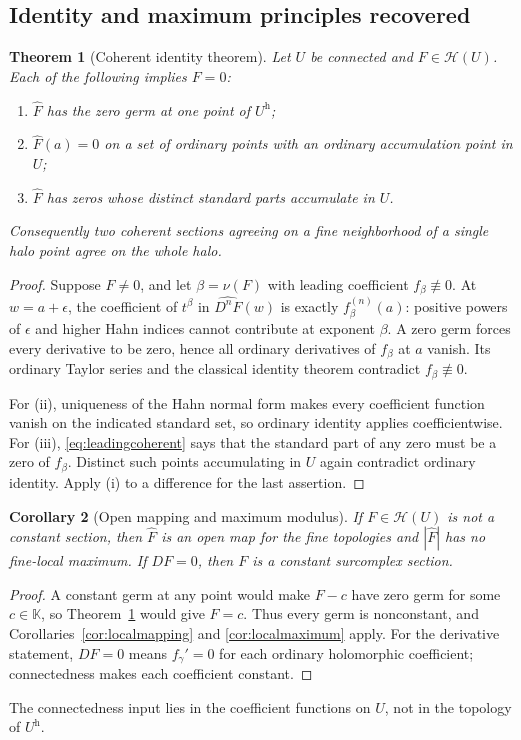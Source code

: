 \documentclass[11pt,a4paper]{article}
\newtheorem{theorem}{Theorem}[section]
\newtheorem{corollary}[theorem]{Corollary}
\theoremstyle{definition}\newtheorem{definition}[theorem]{Definition}
\theoremstyle{remark}\newtheorem{remark}[theorem]{Remark}
\newcommand{\K}{\mathbb K}
\newcommand{\A}{\mathscr H}\newcommand{\hol}{\mathcal O}
\newcommand{\ev}[1]{\widehat{#1}}
\newcommand{\halo}[1]{#1^{\mathrm h}}
\numberwithin{equation}{section}
\begin{document}
\subsection{Identity and maximum principles recovered}
\begin{theorem}[Coherent identity theorem]\label{thm:identity}
Let $U$ be connected and $F\in\A(U)$. Each of the following implies $F=0$:
\begin{enumerate}[label=(\roman*)]
\item $\ev F$ has the zero germ at one point of $\halo U$;
\item $\ev F(a)=0$ on a set of ordinary points with an ordinary accumulation point in $U$;
\item $\ev F$ has zeros whose distinct standard parts accumulate in $U$.
\end{enumerate}
Consequently two coherent sections agreeing on a fine neighborhood of a single halo point agree on the whole halo.
\end{theorem}
\begin{proof}
Suppose $F\ne0$, and let $\beta=\nu(F)$ with leading coefficient $f_\beta\not\equiv0$. At $w=a+\epsilon$, the coefficient of $t^\beta$ in $\ev{D^nF}(w)$ is exactly $f_\beta^{(n)}(a)$: positive powers of $\epsilon$ and higher Hahn indices cannot contribute at exponent $\beta$. A zero germ forces every derivative to be zero, hence all ordinary derivatives of $f_\beta$ at $a$ vanish. Its ordinary Taylor series and the classical identity theorem contradict $f_\beta\not\equiv0$.

For (ii), uniqueness of the Hahn normal form makes every coefficient function vanish on the indicated standard set, so ordinary identity applies coefficientwise. For (iii), \eqref{eq:leadingcoherent} says that the standard part of any zero must be a zero of $f_\beta$. Distinct such points accumulating in $U$ again contradict ordinary identity. Apply (i) to a difference for the last assertion.
\end{proof}

\begin{corollary}[Open mapping and maximum modulus]\label{cor:globalmapping}
If $F\in\A(U)$ is not a constant section, then $\ev F$ is an open map for the fine topologies and $|\ev F|$ has no fine-local maximum. If $DF=0$, then $F$ is a constant surcomplex section.
\end{corollary}
\begin{proof}
A constant germ at any point would make $F-c$ have zero germ for some $c\in\K$, so Theorem~\ref{thm:identity} would give $F=c$. Thus every germ is nonconstant, and Corollaries~\ref{cor:localmapping} and \ref{cor:localmaximum} apply. For the derivative statement, $DF=0$ means $f_\gamma'=0$ for each ordinary holomorphic coefficient; connectedness makes each coefficient constant.
\end{proof}
The connectedness input lies in the coefficient functions on $U$, not in the topology of $\halo U$.
\end{document}
